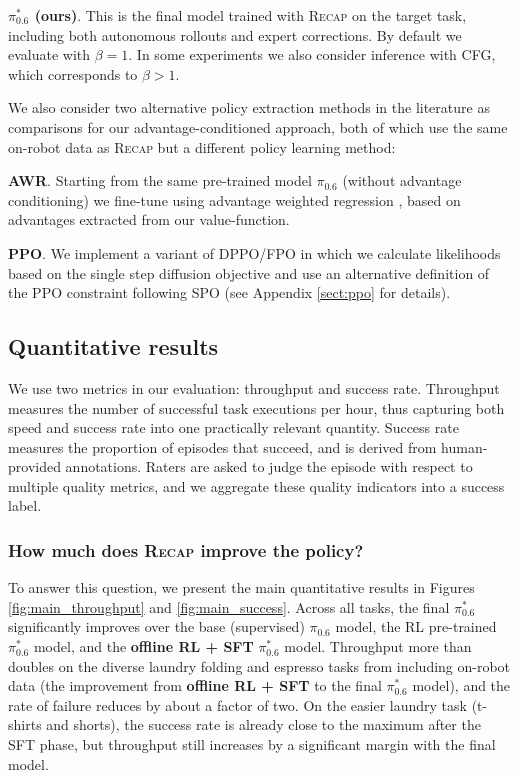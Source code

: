 \documentclass[conference]{IEEEtran}
\def \Pizs {$\pi_{0.6}$}
\def \ModelSymbol {$\pi^{*}_{0.6}$}
\def \MethodName {\textsc{Recap}}
\begin{document}
\noindent \textbf{\ModelSymbol{} (ours)}. This is the final model trained with \MethodName{} on the target task, including both autonomous rollouts and expert corrections. By default we evaluate with $\beta = 1$. In some experiments we also consider inference with CFG, which corresponds to $\beta > 1$. 

\noindent We also consider two alternative policy extraction methods in the literature as comparisons for our advantage-conditioned approach, both of which use the same on-robot data as \MethodName{} but a different policy learning method:

\noindent \textbf{AWR}. Starting from the same pre-trained model \Pizs{} (without advantage conditioning) we fine-tune using advantage weighted regression \citep{peng2019advantage}, based on advantages extracted from our value-function.

\noindent \textbf{PPO}. We implement a variant of DPPO/FPO \citep{Ren2025DPPO,mcallister2025fpo} in which we calculate likelihoods based on the single step diffusion objective and use an alternative definition of the PPO constraint following SPO \citep{xie2025simplepolicyoptimization} (see Appendix \ref{sect:ppo} for details).


\subsection{Quantitative results}

We use two metrics in our evaluation: throughput and success rate. Throughput measures the number of successful task executions per hour, thus capturing both speed and success rate into one practically relevant quantity. Success rate measures the proportion of episodes that succeed, and is derived from human-provided annotations. Raters are asked to judge the episode with respect to multiple quality metrics, and we aggregate these quality indicators into a success label.




\subsubsection{How much does \MethodName{} improve the policy?}

To answer this question, we present the main quantitative results in Figures \ref{fig:main_throughput} and \ref{fig:main_success}. Across all tasks, the final \ModelSymbol{} significantly improves over the base (supervised) \Pizs{} model, the RL pre-trained \ModelSymbol{} model, and the \textbf{offline RL + SFT} \ModelSymbol{} model. Throughput more than doubles on the diverse laundry folding and espresso tasks from including on-robot data (the improvement from \textbf{offline RL + SFT} to the final \ModelSymbol{} model), and the rate of failure reduces by about a factor of two. On the easier laundry task (t-shirts and shorts), the success rate is already close to the maximum after the SFT phase, but throughput still increases by a significant margin with the final model.
\end{document}
